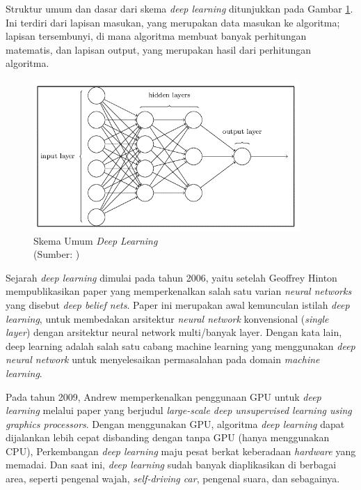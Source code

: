 Struktur umum dan dasar dari skema \textit{deep learning} ditunjukkan pada Gambar \ref{img:Skema-Umum-Deep-Learning}. Ini terdiri dari lapisan masukan, yang merupakan data masukan ke algoritma; lapisan tersembunyi, di mana algoritma membuat banyak perhitungan matematis, dan lapisan output, yang merupakan hasil dari perhitungan algoritma.

\begin{figure}[H]
	\vspace{-0.1cm}
	\begin{center}
		\includegraphics[width=1\columnwidth]{bab2/Gambar/Picture12.png}
	\end{center}
	\vspace{-0.2cm}
	\captionsetup{justification=centering}
	\caption{Skema Umum \textit{Deep Learning}\\(Sumber: \citep{Feizollah2022-tn})}\label{img:Skema-Umum-Deep-Learning}
\end{figure}
Sejarah \textit{deep learning} dimulai pada tahun 2006, yaitu setelah Geoffrey Hinton mempublikasikan paper yang memperkenalkan salah satu varian \textit{neural networks} yang disebut \textit{deep belief nets}. Paper ini merupakan awal kemunculan istilah \textit{deep learning}, untuk membedakan arsitektur \textit{neural network} konvensional (\textit{single layer}) dengan arsitektur neural network multi/banyak layer. Dengan kata lain, deep learning adalah salah satu cabang machine learning yang menggunakan \textit{deep neural network} untuk menyelesaikan permasalahan pada domain \textit{machine learning}. 

Pada tahun 2009, Andrew memperkenalkan penggunaan GPU untuk \textit{deep learning} melalui paper yang berjudul \textit{large-scale deep unsupervised learning using graphics processors}. Dengan menggunakan GPU, algoritma \textit{deep learning} dapat dijalankan lebih cepat disbanding dengan tanpa GPU (hanya menggunakan CPU), Perkembangan \textit{deep learning} maju pesat berkat keberadaan \textit{hardware} yang memadai. Dan saat ini, \textit{deep learning} sudah banyak diaplikasikan di berbagai area, seperti pengenal wajah, \textit{self-driving car}, pengenal suara, dan sebagainya. 

